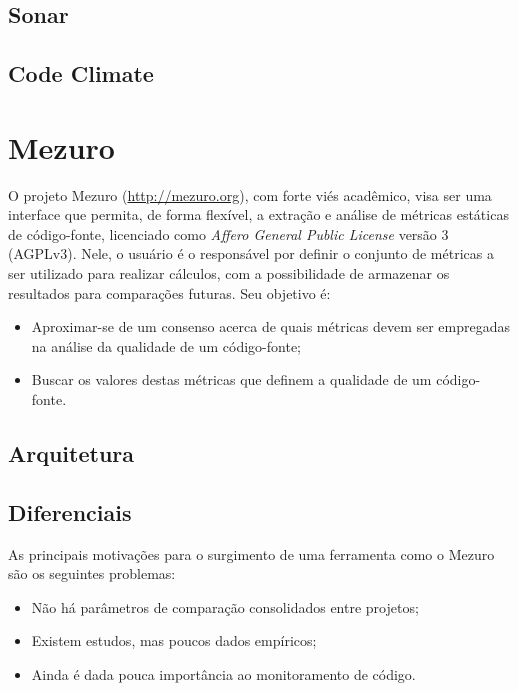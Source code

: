 \documentclass[12pt]{article}
\begin{document}
  \subsection{Sonar}

  \subsection{Code Climate}

\section{Mezuro}
O projeto Mezuro (\url{http://mezuro.org}), com forte viés acadêmico, visa ser uma interface que permita, de forma flexível, a extração e análise de métricas estáticas de código-fonte, licenciado como \textit{Affero General Public License} versão 3 (AGPLv3). Nele, o usuário é o responsável por definir o conjunto de métricas a ser utilizado para realizar cálculos, com a possibilidade de armazenar os resultados para comparações futuras. Seu objetivo é:

\begin{itemize}
    \item Aproximar-se de um consenso acerca de quais métricas devem ser empregadas na análise da qualidade de um código-fonte;
    \item Buscar os valores destas métricas que definem a qualidade de um código-fonte.
\end{itemize}

  \subsection{Arquitetura}

  \subsection{Diferenciais} \label{subsec:motivacao}
  As principais motivações para o surgimento de uma ferramenta como o Mezuro são os seguintes problemas:

  \begin{itemize}
      \item Não há parâmetros de comparação consolidados entre projetos;
      \item Existem estudos, mas poucos dados empíricos;
      \item Ainda é dada pouca importância ao monitoramento de código.
  \end{itemize}
\end{document}
